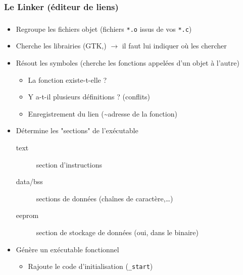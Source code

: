 \subsubsection{Le Linker (éditeur de liens)}
\begin{frame}
\frametitle{\insertsubsubsection}

\begin{itemize}
  \item Regroupe les fichiers objet (fichiers \texttt{*.o} issus de vos \texttt{*.c})
  \item Cherche les librairies (GTK,\…) $\rightarrow$ il faut lui indiquer où les chercher
  \item Résout les symboles (cherche les fonctions appelées d'un objet à l'autre)
    \begin{itemize}
      \item La fonction existe-t-elle ?
      \item Y a-t-il plusieurs définitions ? (conflits)
      \item Enregistrement du lien (\textasciitilde adresse de la fonction)
    \end{itemize}
  \item Détermine les "sections" de l'exécutable
    \begin{description}
      \item[text] section d'instructions
      \item[data/bss] sections de données (chaînes de caractère,…)
      \item[eeprom] section de stockage de données (oui, dans le binaire\…)
    \end{description}
  \item Génère un exécutable fonctionnel
    \begin{itemize}
      \item Rajoute le code d'initialisation (\texttt{\_start})
    \end{itemize}
\end{itemize}

\end{frame}

